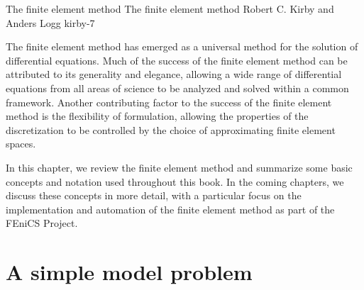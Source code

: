               {The finite element method}
              {The finite element method}
              {Robert C. Kirby and Anders Logg}
              {kirby-7}

The finite element method has emerged as a universal method for the
solution of differential equations. Much of the success of the finite
element method can be attributed to its generality and elegance,
allowing a wide range of differential equations from all areas of
science to be analyzed and solved within a common framework. Another
contributing factor to the success of the finite element method is the
flexibility of formulation, allowing the properties of the
discretization to be controlled by the choice of approximating finite
element spaces.

In this chapter, we review the finite element method and summarize
some basic concepts and notation used throughout this book. In the
coming chapters, we discuss these concepts in more detail, with a
particular focus on the implementation and automation of the finite
element method as part of the FEniCS Project.

\section{A simple model problem}

